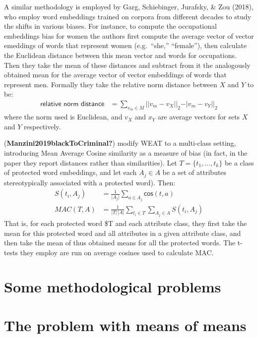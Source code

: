 \documentclass[
  10pt,
  dvipsnames,enabledeprecatedfontcommands]{scrartcl}
\begin{document}
A similar methodology is employed by Garg, Schiebinger, Jurafsky, \& Zou
(2018), who employ word embeddings trained on corpora from different
decades to study the shifts in various biases. For instance, to compute
the occupational embeddings bias for women the authors first compute the
average vector of vector emeddings of words that represent women
(e.g.~``she,'' ``female''), then calculate the Euclidean distance
between this mean vector and words for occupations. Then they take the
mean of these distances and subtract from it the analogously obtained
mean for the average vector of vector embeddings of words that represent
men. Formally they take the relative norm distance between \(X\) and
\(Y\) to be: \begin{align}
\textsf{relative norm distance} & = \sum_{v_m\in M} \vert \vert v_m - v_X\vert \vert_2 - \vert v_m - v_Y\vert \vert_2
\end{align} \noindent where the norm used is Euclidean, and \(v_X\) and
\(x_Y\) are average vectors for sets \(X\) and \(Y\) respectively.

(\textbf{Manzini2019blackToCriminal?}) modify WEAT to a multi-class
setting, introducing Mean Average Cosine similarity as a measure of bias
(in fact, in the paper they report distances rather than similarities).
Let \(T = \{t_1, \dots, t_k\}\) be a class of protected word embeddings,
and let each \(A_j\in A\) be a set of attributes stereotypically
associated with a protected word). Then: \begin{align}
S(t_i, A_j) & = \frac{1}{\vert A_j\vert}\sum_{a\in A_j}\mathsf{cos}(t,a) \\
MAC(T,A) & = \frac{1}{\vert T \vert \,\vert A\vert}\sum_{t_i \in T }\sum_{A_j \in A} S(t_i,A_j)
\end{align} That is, for each protected word \$T and each attribute
class, they first take the mean for this protected word and all
attributes in a given attribute class, and then take the mean of thus
obtained means for all the protected words. The t-tests they employ are
run on average cosines used to calculate MAC.

\hypertarget{some-methodological-problems}{%
\section{Some methodological
problems}\label{some-methodological-problems}}

\hypertarget{the-problem-with-means-of-means}{%
\section{The problem with means of
means}\label{the-problem-with-means-of-means}}
\end{document}
